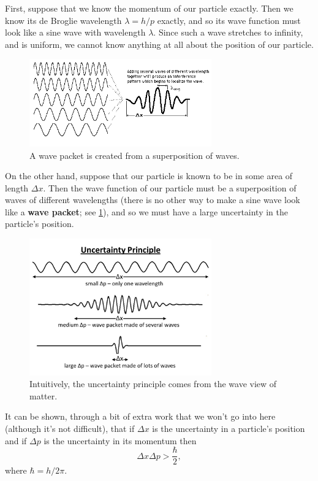 \documentclass[a4paper]{amsbook}
\theoremstyle{definition}
\numberwithin{exercise}{chapter}
\numberwithin{exercise}{chapter}
\begin{document}
First, suppose that we know the momentum of our particle exactly. Then we know its de Broglie wavelength $ \lambda = h/p $ exactly, and so its wave function
must look like a sine wave with wavelength $ \lambda $. Since such a wave stretches to infinity, and is uniform, we cannot know anything at all about
the position of our particle.

\begin{figure}
  \centering
  \includegraphics[width=0.7\textwidth]{uncertainty1}
  \caption{A wave packet is created from a superposition of waves. \label{fig:uncertainty1}}
\end{figure}
On the other hand, suppose that our particle is known to be in some area of length $ \Delta x $. Then the wave function of our particle must be a superposition
of waves of different wavelengths (there is no other way to make a sine wave look like a \textbf{wave packet}; see \cref{fig:uncertainty1}), and so we must have a
large uncertainty in the particle's position.

\begin{figure}
  \centering
  \includegraphics[width=0.7\textwidth]{uncertainty2}
  \caption{Intuitively, the uncertainty principle comes from the wave view of matter. \label{fig:uncertainty2}}
\end{figure}

It can be shown, through a bit of extra work that we won't go into here (although it's not difficult), that if $ \Delta x $ is the uncertainty in
a particle's position and if $ \Delta p $ is the uncertainty in its momentum then
\begin{equation}
  \Delta x \Delta p > \frac{\hbar}{2},
\end{equation}
where $ \hbar = h/2\pi $.
\end{document}
